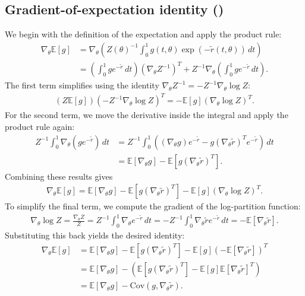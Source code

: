 \documentclass{article}
\begin{document}
\subsection{Gradient-of-expectation identity ()}\label{app:proof-gradient-expectation}

We begin with the definition of the expectation and apply the product rule:
%
\begin{align}
  \nabla_\theta \mathbb{E}[g] & = \nabla_\theta \left( Z(\theta)^{-1} \int_0^1 g(t,\theta) \exp(-\tilde{r}(t,\theta)) \, dt \right)                                            \\
                              & = \left(\int_0^1 g e^{-\tilde{r}} \, dt\right) (\nabla_\theta Z^{-1})^T + Z^{-1} \nabla_\theta \left( \int_0^1 g e^{-\tilde{r}} \, dt \right).
\end{align}
%
The first term simplifies using the identity $\nabla_\theta Z^{-1} = -Z^{-1} \nabla_\theta \log Z$:
%
\begin{align}
  \left(Z \mathbb{E}[g]\right) \left(-Z^{-1} \nabla_\theta \log Z\right)^T = -\mathbb{E}[g] (\nabla_\theta \log Z)^T.
\end{align}
%
For the second term, we move the derivative inside the integral and apply the product rule again:
%
\begin{align}
  Z^{-1} \int_0^1 \nabla_\theta(g e^{-\tilde{r}}) \, dt & = Z^{-1} \int_0^1 \left( (\nabla_\theta g) e^{-\tilde{r}} - g (\nabla_\theta \tilde{r})^T e^{-\tilde{r}} \right) \, dt \\
                                                        & = \mathbb{E}[\nabla_\theta g] - \mathbb{E}[g (\nabla_\theta \tilde{r})^T].
\end{align}
%
Combining these results gives
%
\begin{align}
  \nabla_\theta \mathbb{E}[g] = \mathbb{E}[\nabla_\theta g] - \mathbb{E}[g (\nabla_\theta \tilde{r})^T] - \mathbb{E}[g](\nabla_\theta \log Z)^T.
\end{align}
%
To simplify the final term, we compute the gradient of the log-partition function:
%
\begin{align}
  \nabla_\theta \log Z = \frac{\nabla_\theta Z}{Z} = Z^{-1} \int_0^1 \nabla_\theta e^{-\tilde{r}} \, dt = -Z^{-1} \int_0^1 \nabla_\theta \tilde{r} e^{-\tilde{r}} \, dt = -\mathbb{E}[\nabla_\theta \tilde{r}].
\end{align}
%
Substituting this back yields the desired identity:
%
\begin{align}
  \nabla_\theta \mathbb{E}[g] & = \mathbb{E}[\nabla_\theta g] - \mathbb{E}[g (\nabla_\theta \tilde{r})^T] - \mathbb{E}[g] (-\mathbb{E}[\nabla_\theta \tilde{r}])^T \\
                              & = \mathbb{E}[\nabla_\theta g] - (\mathbb{E}[g (\nabla_\theta \tilde{r})^T] - \mathbb{E}[g] \mathbb{E}[\nabla_\theta \tilde{r}]^T)  \\
                              & = \mathbb{E}[\nabla_\theta g] - \mathrm{Cov}(g, \nabla_\theta \tilde{r}).
\end{align}
\end{document}

